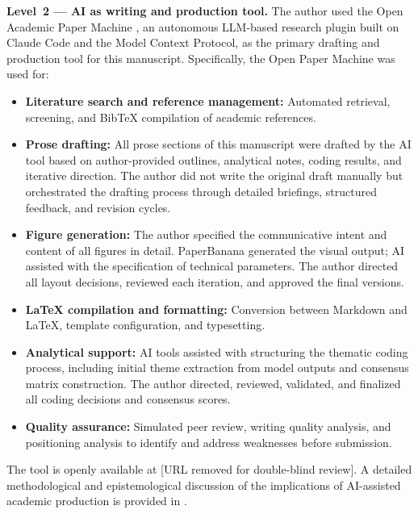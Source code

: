 \documentclass[preprint,review,12pt]{elsarticle}
\begin{document}
\textbf{Level~2 --- AI as writing and production tool.} The author used the Open Academic Paper Machine \citep{anonymized2026openpapermachine}, an autonomous LLM-based research plugin built on Claude Code and the Model Context Protocol, as the primary drafting and production tool for this manuscript. Specifically, the Open Paper Machine was used for:
\begin{itemize}
  \item \textbf{Literature search and reference management:} Automated retrieval, screening, and BibTeX compilation of academic references.
  \item \textbf{Prose drafting:} All prose sections of this manuscript were drafted by the AI tool based on author-provided outlines, analytical notes, coding results, and iterative direction. The author did not write the original draft manually but orchestrated the drafting process through detailed briefings, structured feedback, and revision cycles.
  \item \textbf{Figure generation:} The author specified the communicative intent and content of all figures in detail. PaperBanana \citep{zhu2026paperbanana} generated the visual output; AI assisted with the specification of technical parameters. The author directed all layout decisions, reviewed each iteration, and approved the final versions.
  \item \textbf{\LaTeX{} compilation and formatting:} Conversion between Markdown and \LaTeX{}, template configuration, and typesetting.
  \item \textbf{Analytical support:} AI tools assisted with structuring the thematic coding process, including initial theme extraction from model outputs and consensus matrix construction. The author directed, reviewed, validated, and finalized all coding decisions and consensus scores.
  \item \textbf{Quality assurance:} Simulated peer review, writing quality analysis, and positioning analysis to identify and address weaknesses before submission.
\end{itemize}
The tool is openly available at [URL removed for double-blind review]. A detailed methodological and epistemological discussion of the implications of AI-assisted academic production is provided in \citet{anonymized2026orchestrator}.
\end{document}
